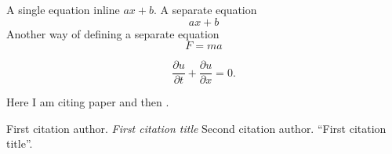 \documentclass{article}
\begin{document}

A single equation inline $ax+b$. A separate equation
$$
ax+b
$$
Another way of defining a separate equation
\[
F=ma
\]

\begin{equation}
\frac{\partial u}{\partial t} + \frac{\partial u}{\partial x} = 0.
\label{eq:advection}
\end{equation}

Here I am citing paper \cite{first_citation} and then \cite{second_citation}.

\begin{thebibliography}{9}
 First citation author. \textit{First citation title}
 Second citation author. ``First citation title''.
\end{thebibliography}
\end{document}
